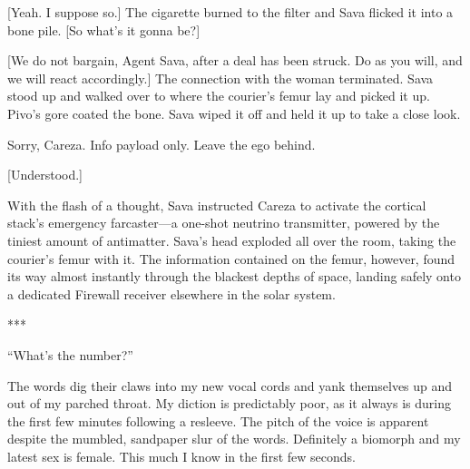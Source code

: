 [Yeah. I suppose so.] The cigarette burned to the filter and Sava flicked it into a bone pile. [So what's it gonna be?]

[We do not bargain, Agent Sava, after a deal has been struck. Do as you will, and we will react accordingly.] The connection with the woman terminated. Sava stood up and walked over to where the courier's femur lay and picked it up. Pivo's gore coated the bone. Sava wiped it off and held it up to take a close look.

Sorry, Careza. Info payload only. Leave the ego behind.

[Understood.]

With the flash of a thought, Sava instructed Careza to activate the cortical stack's emergency farcaster—a one-shot neutrino transmitter, powered by the tiniest amount of antimatter. Sava's head exploded all over the room, taking the courier's femur with it. The information contained on the femur, however, found its way almost instantly through the blackest depths of space, landing safely onto a dedicated Firewall receiver elsewhere in the solar system.

\begin{center} *** \end{center}

``What's the number?''

The words dig their claws into my new vocal cords and yank themselves up and out of my parched throat. My diction is predictably poor, as it always is during the first few minutes following a resleeve. The pitch of the voice is apparent despite the mumbled, sandpaper slur of the words. Definitely a biomorph and my latest sex is female. This much I know in the first few seconds.

